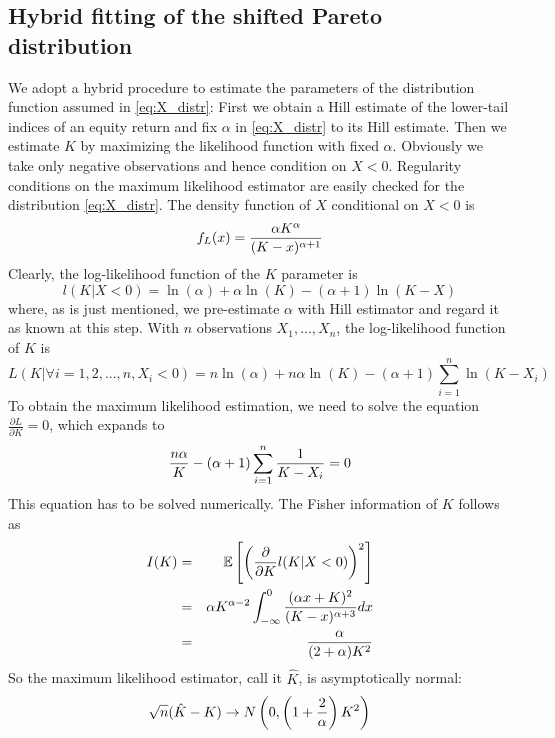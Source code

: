 \documentclass{article}
\newcommand{\pd}[2]{
  \frac{\partial #1}{\partial #2}
}
\newcommand{\opd}[1]{
  \frac{\partial}{\partial #1}
}
\newcommand{\E}{
  \mathbb{E}
}
\newcommand{\1}[1]{
  \mathbf{1}_{\{#1\}}
}
\begin{document}
\subsection{Hybrid fitting of the shifted Pareto distribution}
\label{sec:hybrid_estimation}
We adopt a hybrid procedure to estimate the parameters of the
distribution function assumed in \eqref{eq:X_distr}: First we
obtain a Hill estimate of the lower-tail indices of an
equity return and fix $\alpha$ in \eqref{eq:X_distr}
to its Hill estimate. Then we estimate $K$ by maximizing
the likelihood function with fixed $\alpha$. Obviously we take only
negative observations and hence condition on $X < 0$. Regularity
conditions on the maximum likelihood estimator are easily checked for
the distribution \eqref{eq:X_distr}.
The density function of $X$ conditional on $X < 0$ is
\[
f_L(x) = {\alpha K^{\alpha} \over (K - x)^{\alpha + 1}}
\]
Clearly, the log-likelihood function of the $K$ parameter is
\[
l(K | X < 0) = \ln(\alpha) + \alpha \ln(K) - (\alpha + 1)\ln(K - X)
\]
where, as is just mentioned, we pre-estimate $\alpha$ with Hill
estimator and regard it as known at this step. With $n$ observations
$X_1, \dots, X_n$, the log-likelihood function of $K$ is
\[
L(K | \forall i=1,2,...,n, X_i < 0) = n \ln(\alpha) + n \alpha \ln(K)
- (\alpha + 1) \sum_{i=1}^n \ln(K - X_i)
\]
To obtain the maximum likelihood estimation, we need to solve the
equation $\pd{L}{K} = 0$, which expands to
\[
{n \alpha \over K} - (\alpha + 1) \sum_{i=1}^n {1 \over K - X_i} = 0
\]
This equation has to be solved numerically.
The Fisher information of $K$ follows as
\begin{eqnarray*}
  I(K) &=& \E\left[ \left( \opd{K} l(K | X < 0) \right)^2 \right] \\
  &=& \alpha K^{\alpha - 2}
  \int_{-\infty}^0 {(\alpha x + K)^2 \over (K - x)^{\alpha + 3}} dx \\
  &=& {\alpha \over (2 + \alpha) K^2}
\end{eqnarray*}
So the maximum likelihood estimator, call it $\hat K$, is
asymptotically normal:
\[
\sqrt n (\hat K - K) \to N \left(
  0, \left( 1 + {2 \over \alpha} \right) K^2
\right)
\]
\end{document}
